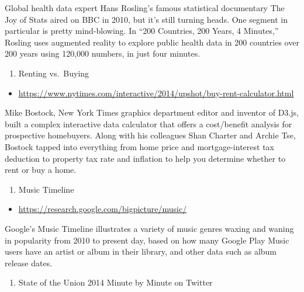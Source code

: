 \documentclass[]{book}
\providecommand{\tightlist}{%
  \setlength{\itemsep}{0pt}\setlength{\parskip}{0pt}}
\theoremstyle{definition}
\theoremstyle{definition}
\theoremstyle{definition}
\theoremstyle{remark}
\begin{document}
Global health data expert Hans Rosling's famous statistical documentary
The Joy of Stats aired on BBC in 2010, but it's still turning heads. One
segment in particular is pretty mind-blowing. In ``200 Countries, 200
Years, 4 Minutes,'' Rosling uses augmented reality to explore public
health data in 200 countries over 200 years using 120,000 numbers, in
just four minutes.

\begin{enumerate}
\def\labelenumi{\arabic{enumi}.}
\setcounter{enumi}{4}
\tightlist
\item
  Renting vs.~Buying
\end{enumerate}

\begin{itemize}
\tightlist
\item
  \url{https://www.nytimes.com/interactive/2014/upshot/buy-rent-calculator.html}
\end{itemize}

Mike Bostock, New York Times graphics department editor and inventor of
D3.js, built a complex interactive data calculator that offers a
cost/benefit analysis for prospective homebuyers. Along with his
colleagues Shan Charter and Archie Tse, Bostock tapped into everything
from home price and mortgage-interest tax deduction to property tax rate
and inflation to help you determine whether to rent or buy a home.

\begin{enumerate}
\def\labelenumi{\arabic{enumi}.}
\setcounter{enumi}{5}
\tightlist
\item
  Music Timeline
\end{enumerate}

\begin{itemize}
\tightlist
\item
  \url{https://research.google.com/bigpicture/music/}
\end{itemize}

Google's Music Timeline illustrates a variety of music genres waxing and
waning in popularity from 2010 to present day, based on how many Google
Play Music users have an artist or album in their library, and other
data such as album release dates.

\begin{enumerate}
\def\labelenumi{\arabic{enumi}.}
\setcounter{enumi}{6}
\tightlist
\item
  State of the Union 2014 Minute by Minute on Twitter
\end{enumerate}
\end{document}
